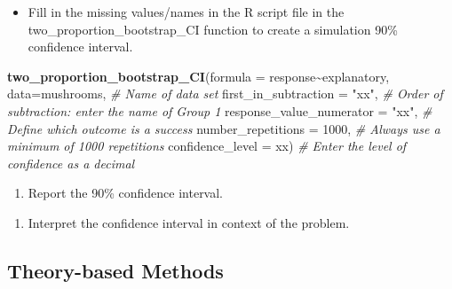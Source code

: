 \documentclass[
]{report}
\newenvironment{Shaded}{\begin{snugshade}}{\end{snugshade}}
\newcommand{\AttributeTok}[1]{\textcolor[rgb]{0.13,0.29,0.53}{#1}}
\newcommand{\CommentTok}[1]{\textcolor[rgb]{0.56,0.35,0.01}{\textit{#1}}}
\newcommand{\DecValTok}[1]{\textcolor[rgb]{0.00,0.00,0.81}{#1}}
\newcommand{\FunctionTok}[1]{\textcolor[rgb]{0.13,0.29,0.53}{\textbf{#1}}}
\newcommand{\NormalTok}[1]{#1}
\newcommand{\SpecialCharTok}[1]{\textcolor[rgb]{0.81,0.36,0.00}{\textbf{#1}}}
\newcommand{\StringTok}[1]{\textcolor[rgb]{0.31,0.60,0.02}{#1}}
\providecommand{\tightlist}{%
  \setlength{\itemsep}{0pt}\setlength{\parskip}{0pt}}
\begin{document}
\vspace{.15in}

\begin{itemize}
\tightlist
\item
  Fill in the missing values/names in the R script file in the two\_proportion\_bootstrap\_CI function to create a simulation 90\% confidence interval.
\end{itemize}

\begin{Shaded}
\begin{Highlighting}[]
\FunctionTok{two\_proportion\_bootstrap\_CI}\NormalTok{(}\AttributeTok{formula =}\NormalTok{ response}\SpecialCharTok{\textasciitilde{}}\NormalTok{explanatory, }
         \AttributeTok{data=}\NormalTok{mushrooms, }\CommentTok{\# Name of data set}
         \AttributeTok{first\_in\_subtraction =} \StringTok{"xx"}\NormalTok{, }\CommentTok{\# Order of subtraction: enter the name of Group 1}
         \AttributeTok{response\_value\_numerator =} \StringTok{"xx"}\NormalTok{, }\CommentTok{\# Define which outcome is a success }
         \AttributeTok{number\_repetitions =} \DecValTok{1000}\NormalTok{, }\CommentTok{\# Always use a minimum of 1000 repetitions}
         \AttributeTok{confidence\_level =}\NormalTok{ xx) }\CommentTok{\# Enter the level of confidence as a decimal}
\end{Highlighting}
\end{Shaded}

\begin{enumerate}
\def\labelenumi{\arabic{enumi}.}
\setcounter{enumi}{7}
\tightlist
\item
  Report the 90\% confidence interval.
\end{enumerate}

\vspace{0.2in}

\begin{enumerate}
\def\labelenumi{\arabic{enumi}.}
\setcounter{enumi}{8}
\tightlist
\item
  Interpret the confidence interval in context of the problem.
\end{enumerate}

\vspace{1in}

\subsection*{Theory-based Methods}\label{theory-based-methods}
\end{document}
